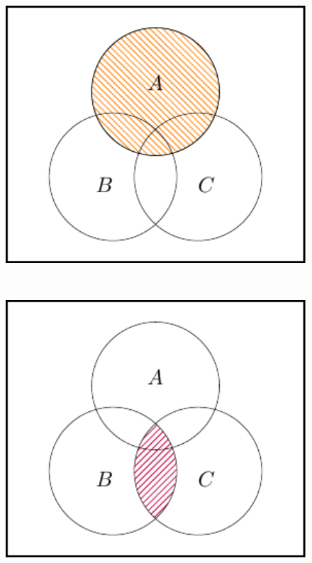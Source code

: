 \documentclass[
  letterpaper,
  DIV=11,
  numbers=noendperiod]{scrreprt}
\theoremstyle{remark}
\begin{document}
\begin{figure}

{\centering \includegraphics[width=1\textwidth,height=\textheight]{sections/L03-events_files/figure-pdf/dist1-1.pdf}

}

\end{figure}

~

\begin{figure}

{\centering \includegraphics[width=1\textwidth,height=\textheight]{sections/L03-events_files/figure-pdf/dist2-1.pdf}

}

\end{figure}
\end{document}
